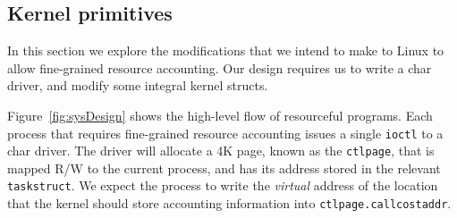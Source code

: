 \documentclass[12pt]{article}
\def\_{\textunderscore\-}
\begin{document}
%
%
%

  \subsection{Kernel primitives}

  In this section we explore the modifications that we intend to make to Linux to allow fine-grained resource accounting. Our design requires us to write a char driver, and modify some integral kernel structs.

  Figure~\ref{fig:sysDesign} shows the high-level flow of resourceful programs. Each process that requires fine-grained resource accounting issues a single \texttt{ioctl} to a char driver. The driver will allocate a 4K page, known as the \texttt{ctl\_page}, that is mapped R/W to the current process, and has its address stored in the relevant \texttt{task\_struct}. We expect the process to write the \emph{virtual} address of the location that the kernel should store accounting information into \texttt{ctl\_page.call\_cost\_addr}.
\end{document}
